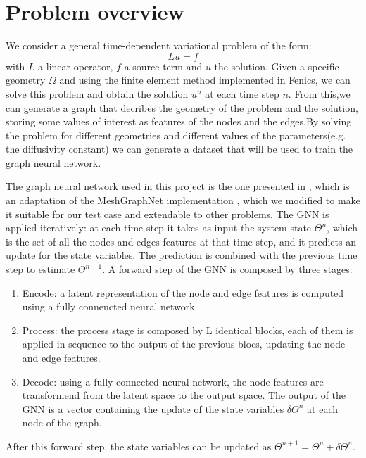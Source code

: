 \documentclass[11pt,a4paper]{article}
\begin{document}
\section{Problem overview}

We consider a general time-dependent variational problem of the form:
\[Lu=f\]
with \(L\) a linear operator, \(f\) a source term and \(u\) the solution. Given a specific geometry \(\Omega\) and using the finite element method implemented in Fenics, we can solve this problem and obtain the solution \(u^{n}\) at each time step \(n\). From this,we can generate a graph that decribes the geometry of the problem and the solution, storing some values of interest as features of the nodes and the edges.By solving the problem for different geometries and different values of the parameters(e.g. the diffusivity constant) we can generate a dataset that will be used to train the graph neural network. 

The graph neural network used in this project is the one presented in \cite{Luca}, which is an adaptation of the MeshGraphNet implementation \cite{MeshGraphNet}, which we modified to make it suitable for our test case and extendable to other problems.
The GNN is applied iteratively: at each time step it takes as input the system state \(\Theta^{n}\), which is the set of all the nodes and edges features at that time step, and it predicts an update for the state variables. The prediction is combined with the previous time step to estimate \(\Theta^{n+1}\). 
A forward step of the GNN is composed by three stages:
\begin{enumerate}
    \item Encode: a latent representation of the node and edge features is computed using a fully connencted neural network.
    \item Process: the process stage is composed by L identical blocks, each of them is applied in sequence to the output of the previous blocs, updating the node and edge features. 
    \item Decode: using a fully connected neural network, the node features are transformend from the latent space to the output space. The output of the GNN is a vector containing the update of the state variables \(\delta\Theta^n\) at each node of the graph. 
\end{enumerate}
After this forward step, the state variables can be updated as \(\Theta^{n+1} = \Theta^{n} + \delta\Theta^{n}\).
\end{document}
